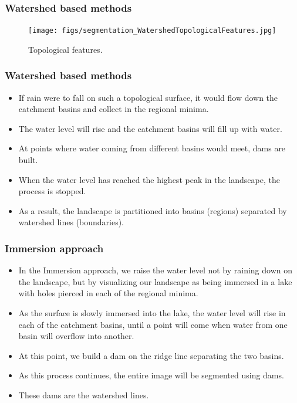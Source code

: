\begin{frame}
\frametitle{Watershed based methods}
\logoCSIPCPL\mypagenum	
	\begin{figure}[!htp]
		\texttt{[image: figs/segmentation\_WatershedTopologicalFeatures.jpg]}
		\caption{Topological features.}
		\label{fig:WatershedTopologicalFeatures}
	\end{figure}
\end{frame}





\begin{frame}
\frametitle{Watershed based methods}
\logoCSIPCPL\mypagenum
	\begin{itemize}
		\item If rain were to fall on such a topological surface, it would flow down the catchment basins and collect in the regional minima.
		\item The water level will rise and the catchment basins will fill up with water.
		\item At points where water coming from different basins would meet, dams are built.
		\item When the water level has reached the highest peak in the landscape, the process is stopped.
		\item As a result, the landscape is partitioned into basins (regions) separated by watershed lines (boundaries).
	\end{itemize}
\end{frame}





\begin{frame}
\frametitle{Immersion approach}
\logoCSIPCPL\mypagenum
	\begin{itemize}
		\item In the Immersion approach, we raise the water level not by raining down on the landscape, but by visualizing our landscape as
		being immersed in a lake with holes pierced in each of the regional minima.
		\item As the surface is slowly immersed into the lake, the water level will rise in each of the catchment basins, until a point will come when water from one basin will overflow into another.
		\item At this point, we build a dam on the ridge line separating the two basins.
		\item As this process continues, the entire image will be segmented using dams.
		\item These dams are the watershed lines.
	\end{itemize}
\end{frame}





